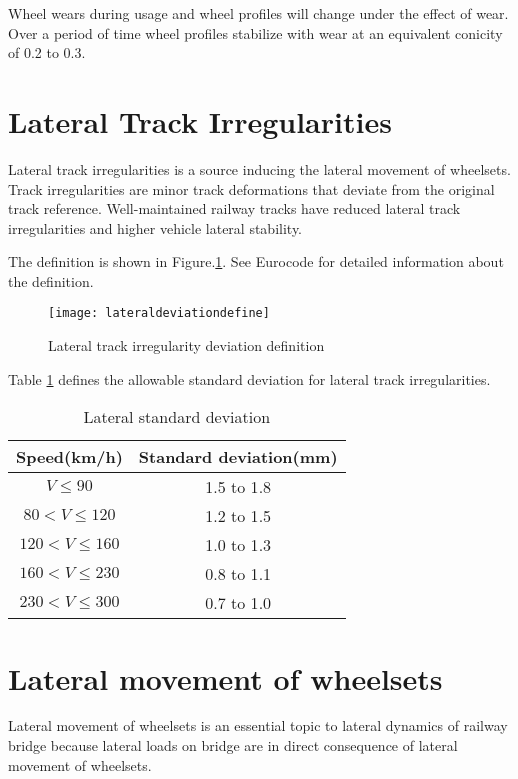 Wheel wears during usage and wheel profiles will change under the effect of wear. Over a period of time wheel profiles stabilize with wear at an equivalent conicity of 0.2 to 0.3\cite{esveld2001modern}. 

\section{Lateral Track Irregularities}
Lateral track irregularities is a source inducing the lateral movement of wheelsets. Track irregularities are minor track deformations that deviate from the original track reference. Well-maintained railway tracks have reduced lateral track irregularities and higher vehicle lateral stability.

The definition is shown in Figure.\ref{fig:lateraldeviationdefine}. See Eurocode\cite{13848} for detailed information about the definition.

\begin{figure}[h]
    \centering
    \texttt{[image: lateraldeviationdefine]}
    \caption{Lateral track irregularity deviation definition\cite{13848}}
    \label{fig:lateraldeviationdefine}
\end{figure}

Table \ref{tab:lateraldeviation}\cite{13848} defines the allowable standard deviation for lateral track irregularities. 

\begin{table}[h]
    \centering
    \caption{Lateral standard deviation\citep[Extracted from][Table B.6]{13848}}
    \begin{tabular}{cc}
        \hline
        Speed(km/h) & Standard deviation(mm) \\
        \hline
        $V\leq 90$ & 1.5 to 1.8 \\
        $80 < V \leq 120$ & 1.2 to 1.5 \\
        $120 < V \leq 160$ & 1.0 to 1.3 \\
        $160 <V \leq 230$ & 0.8 to 1.1 \\
        $230 <V \leq 300$ & 0.7 to 1.0 \\
        \hline
    \end{tabular}
    \label{tab:lateraldeviation}
\end{table}

\section{Lateral movement of wheelsets}
Lateral movement of wheelsets is an essential topic to lateral dynamics of railway bridge because lateral loads on bridge are in direct consequence of lateral movement of wheelsets. 

